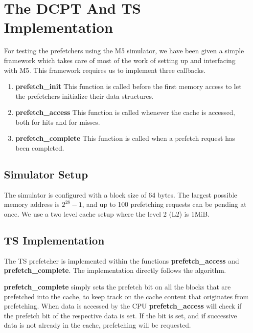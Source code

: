 \section{The DCPT And TS Implementation}
\label{section:scheme}

For testing the prefetchers using the M5 simulator, we have been given a simple
framework which takes care of most of the work of setting up and interfacing with
M5. This framework requires us to implement three callbacks.

\begin{enumerate}
	\item \textbf{prefetch\_init}
		This function is called before the first memory access to let the
		prefetchers initialize their data structures.
	\item \textbf{prefetch\_access}
		This function is called whenever the cache is accessed, both for hits
		and for misses.
	\item \textbf{prefetch\_complete}
		This function is called when a prefetch request has been completed.
\end{enumerate}

\subsection{Simulator Setup}

The simulator is configured with a block size of 64 bytes. The largest possible
memory address is $2^{28}-1$, and up to 100 prefetching requests can be pending
at once. We use a two level cache setup where the level 2 (L2) is 1MiB. 


\subsection{TS Implementation}

The TS prefetcher is implemented within the functions \textbf{prefetch\_access}
and \textbf{prefetch\_complete}. The implementation directly follows the
algorithm.

\textbf{prefetch\_complete} simply sets the prefetch bit on all the blocks that
are prefetched into the cache, to keep track on the cache content that
originates from prefetching. When data is accessed by the CPU
\textbf{prefetch\_access} will check if the prefetch bit of the respective data
is set. If the bit is set, and if successive data is not already in the cache,
prefetching will be requested.

